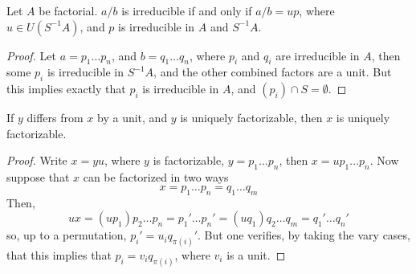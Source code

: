 \begin{lemma}
    Let $A$ be factorial. $a/b$ is irreducible if and only if $a/b = up$, where $u \in U(S^{-1}A)$, and $p$ is irreducible in $A$ and $S^{-1}A$.
\end{lemma}
\begin{proof}
     Let $a = p_1 \dots p_n$, and $b = q_1 \dots q_n$, where $p_i$ and $q_i$ are irreducible in $A$, then some $p_i$ is irreducible in $S^{-1}A$, and the other combined factors are a unit. But this implies exactly that $p_i$ is irreducible in $A$, and $(p_i) \cap S = \emptyset$.
\end{proof}

\begin{lemma}
    If $y$ differs from $x$ by a unit, and $y$ is uniquely factorizable, then $x$ is uniquely factorizable.
\end{lemma}
\begin{proof}
    Write $x = yu$, where $y$ is factorizable, $y = p_1 \dots p_n$, then $x = u p_1 \dots p_n$. Now suppose that $x$ can be factorized in two ways
    \[ x = p_1 \dots p_n = q_1 \dots q_m \]
    Then,
    \[ ux = (up_1) p_2 \dots p_n = p_1' \dots p_n' = (uq_1) q_2 \dots q_m = q_1' \dots q_n' \]
    so, up to a permutation, $p_i' = u_i q_{\pi(i)}'$. But one verifies, by taking the vary cases, that this implies that $p_i = v_i q_{\pi(i)}$, where $v_i$ is a unit.
\end{proof}


